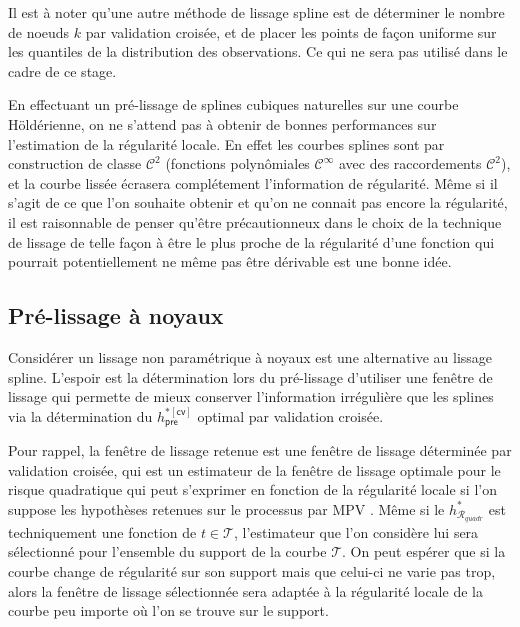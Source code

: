 Il est à noter qu'une autre méthode de lissage spline est de déterminer le nombre de noeuds $k$ par validation croisée, et de placer les points de façon uniforme sur les quantiles de la distribution des observations. Ce qui ne sera pas utilisé dans le cadre de ce stage.

\bigskip

En effectuant un pré-lissage de splines cubiques naturelles sur une courbe Höldérienne, on ne s'attend pas à obtenir de bonnes performances sur l'estimation de la régularité locale. En effet les courbes splines sont par construction de classe $\mathcal C^2$ (fonctions polynômiales $\mathcal C ^\infty$ avec des raccordements $\mathcal C^2$), et la courbe lissée écrasera complétement l'information de régularité. Même si il s'agit de ce que l'on souhaite obtenir et qu'on ne connait pas encore la régularité, il est raisonnable de penser qu'être précautionneux dans le choix de la technique de lissage de telle façon à être le plus proche de la régularité d'une fonction qui pourrait potentiellement ne même pas être dérivable est une bonne idée.



\subsection{Pré-lissage à noyaux}

Considérer un lissage non paramétrique à noyaux est une alternative au lissage spline. L'espoir est la détermination lors du pré-lissage d'utiliser une fenêtre de lissage qui permette de mieux conserver l'information irrégulière que les splines via la détermination du $h^{*[\textsf{cv}]}_{\textsf{pre}}$ optimal par validation croisée.

\bigskip

Pour rappel, la fenêtre de lissage retenue est une fenêtre de lissage déterminée par validation croisée, qui est un estimateur de la fenêtre de lissage optimale pour le risque quadratique qui peut s'exprimer en fonction de la régularité locale si l'on suppose les hypothèses retenues sur le processus par MPV \cite{maissoro-SmoothnessFTSweakDep}. Même si le $h^*_{\mathcal R_{quadr}}$ est techniquement une fonction de $t \in \mathcal T$, l'estimateur que l'on considère lui sera sélectionné pour l'ensemble du support de la courbe $\mathcal T$. On peut espérer que si la courbe change de régularité sur son support mais que celui-ci ne varie pas trop, alors la fenêtre de lissage sélectionnée sera adaptée à la régularité locale de la courbe peu importe où l'on se trouve sur le support.


